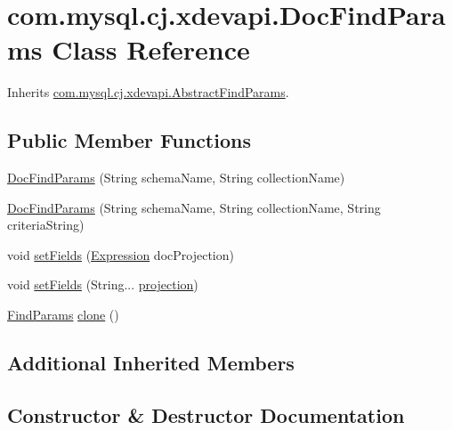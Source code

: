 \hypertarget{classcom_1_1mysql_1_1cj_1_1xdevapi_1_1_doc_find_params}{}\section{com.\+mysql.\+cj.\+xdevapi.\+Doc\+Find\+Params Class Reference}
\label{classcom_1_1mysql_1_1cj_1_1xdevapi_1_1_doc_find_params}


Inherits \mbox{\hyperlink{classcom_1_1mysql_1_1cj_1_1xdevapi_1_1_abstract_find_params}{com.\+mysql.\+cj.\+xdevapi.\+Abstract\+Find\+Params}}.

\subsection*{Public Member Functions}
\begin{DoxyCompactItemize}
\item 
\mbox{\hyperlink{classcom_1_1mysql_1_1cj_1_1xdevapi_1_1_doc_find_params_ac31ada642046a7d3347c61569f742b51}{Doc\+Find\+Params}} (String schema\+Name, String collection\+Name)
\item 
\mbox{\hyperlink{classcom_1_1mysql_1_1cj_1_1xdevapi_1_1_doc_find_params_a5cf38a2dddc5c43c24a945dd106dfe82}{Doc\+Find\+Params}} (String schema\+Name, String collection\+Name, String criteria\+String)
\item 
void \mbox{\hyperlink{classcom_1_1mysql_1_1cj_1_1xdevapi_1_1_doc_find_params_ae329a9e3cd381af7fa643016bf095061}{set\+Fields}} (\mbox{\hyperlink{classcom_1_1mysql_1_1cj_1_1xdevapi_1_1_expression}{Expression}} doc\+Projection)
\item 
void \mbox{\hyperlink{classcom_1_1mysql_1_1cj_1_1xdevapi_1_1_doc_find_params_a01e55531bef9b0d461c559257f5b6b0c}{set\+Fields}} (String... \mbox{\hyperlink{classcom_1_1mysql_1_1cj_1_1xdevapi_1_1_abstract_find_params_aa2f21464c6948fd8938d5663b997a18a}{projection}})
\item 
\mbox{\hyperlink{interfacecom_1_1mysql_1_1cj_1_1xdevapi_1_1_find_params}{Find\+Params}} \mbox{\hyperlink{classcom_1_1mysql_1_1cj_1_1xdevapi_1_1_doc_find_params_af7624d4542d4cef6cb80f12e3feec405}{clone}} ()
\end{DoxyCompactItemize}
\subsection*{Additional Inherited Members}


\subsection{Constructor \& Destructor Documentation}
\mbox{\label{classcom_1_1mysql_1_1cj_1_1xdevapi_1_1_doc_find_params_ac31ada642046a7d3347c61569f742b51}} 
